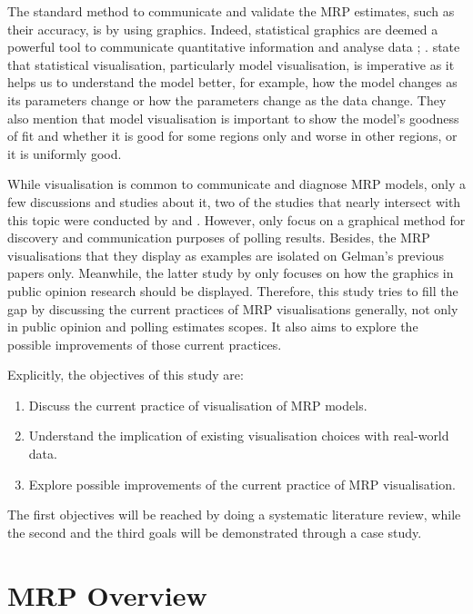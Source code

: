 \documentclass{monashthesis}
\begin{document}
The standard method to communicate and validate the MRP estimates, such as their accuracy, is by using graphics. Indeed, statistical graphics are deemed a powerful tool to communicate quantitative information and analyse data \autocite{ClevelandWilliamS}; \autocite{1983Gmfd}. \textcite{WickhamHadley2015VsmR} state that statistical visualisation, particularly model visualisation, is imperative as it helps us to understand the model better, for example, how the model changes as its parameters change or how the parameters change as the data change. They also mention that model visualisation is important to show the model's goodness of fit and whether it is good for some regions only and worse in other regions, or it is uniformly good.

While visualisation is common to communicate and diagnose MRP models, only a few discussions and studies about it, two of the studies that nearly intersect with this topic were conducted by \textcite{mekelagelman} and \textcite{saundra}. However, \textcite{mekelagelman} only focus on a graphical method for discovery and communication purposes of polling results. Besides, the MRP visualisations that they display as examples are isolated on Gelman's previous papers only. Meanwhile, the latter study by \textcite{saundra} only focuses on how the graphics in public opinion research should be displayed. Therefore, this study tries to fill the gap by discussing the current practices of MRP visualisations generally, not only in public opinion and polling estimates scopes. It also aims to explore the possible improvements of those current practices.

Explicitly, the objectives of this study are:

\begin{enumerate}
\def\labelenumi{\arabic{enumi}.}
\tightlist
\item
  Discuss the current practice of visualisation of MRP models.
\item
  Understand the implication of existing visualisation choices with real-world data.
\item
  Explore possible improvements of the current practice of MRP visualisation.
\end{enumerate}

The first objectives will be reached by doing a systematic literature review, while the second and the third goals will be demonstrated through a case study.

\hypertarget{overview}{%
\section{MRP Overview}\label{overview}}
\end{document}
